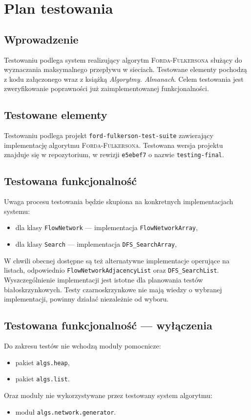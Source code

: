 \documentclass[10pt]{dokument-tiwo}
\begin{document}
\MakeDokumentMeta


\section{Plan testowania}

\subsection{Wprowadzenie}
Testowaniu podlega system realizujący algorytm \textsc{Forda-Fulkersona} służący
do wyznaczania maksymalnego przepływu w sieciach. Testowane elementy pochodzą z
kodu załączonego wraz z książką \emph{Algorytmy. Almanach}. Celem testowania
jest zweryfikowanie poprawności już zaimplementowanej funkcjonalności.

\subsection{Testowane elementy}
Testowaniu podlega projekt \texttt{ford-fulkerson-test-suite} zawierający
implementację algorytmu \textsc{Forda-Fulkersona}. Testowana wersja projektu
znajduje się w repozytorium, w rewizji \texttt{e5ebef7} o nazwie \texttt
{testing-final}.

\subsection{Testowana funkcjonalność}
Uwaga procesu testowania będzie skupiona na konkretnych implementacjach systemu:
\begin{itemize}[nosep]
    \item dla klasy \texttt{FlowNetwork} --- implementacja
        \texttt{FlowNetworkArray},
    \item dla klasy \texttt{Search} --- implementacja \texttt{DFS\_SearchArray},
\end{itemize}
W chwili obecnej dostępne są też alternatywne implementacje operujące na
listach, odpowiednio \texttt{FlowNetworkAdjacencyList} oraz
\texttt{DFS\_SearchList}. Wyszczególnienie implementacji jest istotne dla
planowania testów biało\dywiz skrzynkowych. Testy czarno\dywiz skrzynkowe
nie mają wiedzy o wybranej implementacji, powinny działać niezależnie od wyboru.

\subsection{Testowana funkcjonalność --- wyłączenia}
Do zakresu testów nie wchodzą moduły pomocnicze:
\begin{itemize}[nosep]
    \item pakiet \texttt{algs.heap},
    \item pakiet \texttt{algs.list}.
\end{itemize}
Oraz moduły nie wykorzystywane przez testowany system algorytmu:
\begin{itemize}[nosep]
    \item moduł \texttt{algs.network.generator}.
\end{itemize}
\end{document}
